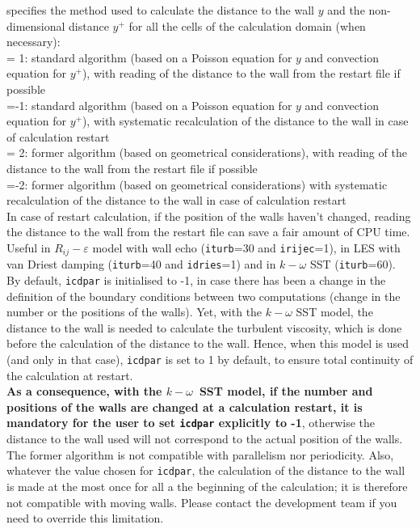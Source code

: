 {specifies the method used to calculate the distance to the wall $y$ and the
non-dimensional distance $y^+$ for all the
cells of the calculation domain (when necessary):\\
\hspace*{1.3cm}= 1: standard algorithm (based on a Poisson equation for $y$ and
convection equation for $y^+$),
with reading of the distance to the wall from the restart file
if possible\\
\hspace*{1.3cm}=-1: standard algorithm (based on a Poisson equation for $y$ and
convection equation for $y^+$),
with systematic recalculation of the distance to the wall in case of
calculation restart\\
\hspace*{1.3cm}= 2: former algorithm (based on geometrical
considerations),
with reading of the distance to the wall from the restart file
if possible\\
\hspace*{1.3cm}=-2: former algorithm (based on geometrical
considerations) with systematic recalculation of the distance to the
wall in case of calculation restart\\
In case of restart calculation, if the position of the walls haven't changed,
reading the distance to the wall from the restart file can save a fair amount of
CPU time.\\
Useful in $R_{ij}-\varepsilon$ model with wall echo ({\tt iturb}=30 and
{\tt irijec}=1), in LES with van Driest damping ({\tt iturb}=40 and
{\tt idries}=1) and in $k-\omega$ SST ({\tt iturb}=60). \\
By default, {\tt icdpar} is initialised to -1, in case there has been a change in the
definition of the boundary conditions between two computations (change in the
number or the positions of the walls). Yet, with the $k-\omega$ SST model, the
distance to the wall is needed to calculate the turbulent viscosity, which is
done before the calculation of the distance to the wall. Hence, when this model
is used (and only in that case), {\tt icdpar} is set to 1 by default, to ensure total
continuity of the calculation at restart.\\
{\bf As a consequence, with the \boldmath$k-\omega$\unboldmath\ SST model, if
the number and positions of the walls are changed at a calculation restart, it
is mandatory for the user to set {\tt icdpar} explicitly to -1}, otherwise the
distance to the wall used will not correspond to the actual position of the
walls.\\
The former algorithm is not compatible with parallelism nor periodicity. Also,
whatever the value chosen for {\tt icdpar}, the calculation of the distance to the
wall is made at the most once for all a the beginning of the calculation; it is
therefore not compatible with moving walls. Please contact the development team
if you need to override this limitation.}

